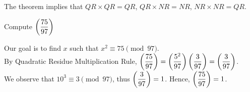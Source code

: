 \noindent
The theorem implies that $QR\times QR = QR$, $QR\times NR = NR$, $NR\times NR = QR$.

\begin{exercise}
Compute $\legendre[97]{75}$
\end{exercise}

\begin{solution}
Our goal is to find $x$ such that $x^{2}\equiv 75 \pmod{97}$. \\
By Quadratic Residue Multiplication Rule, $\legendre[97]{75} = \legendre[97]{5^{2}}\legendre[97]{3} = \legendre[97]{3}$. \\
We observe that $10^{3}\equiv 3 \pmod{97}$, thus $\legendre[97]{3} = 1$. Hence, $\legendre[97]{75} = 1$.
\end{solution}